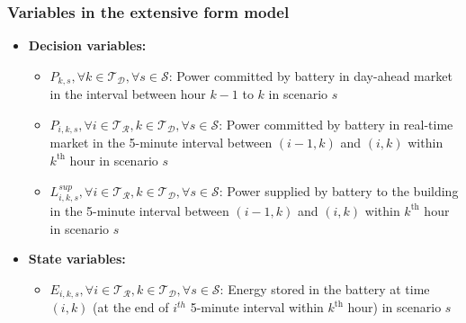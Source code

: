 \documentclass[11pt,twoside]{article}
\begin{document}
\subsubsection{Variables in the extensive form model}\label{subsubsec:var_ext}
\begin{itemize}
\item \textbf{Decision variables:}
\begin{itemize}
\item[\textbullet] $P_{k,s}, \forall k \in \mathcal{T_D}, \forall s \in \mathcal{S}$: Power committed by battery in day-ahead market in the interval between hour $k-1$ to $k$ in scenario $s$
\item[\textbullet] $P_{i,k,s}, \forall i \in \mathcal{T_R}, k \in \mathcal{T_D}, \forall s \in \mathcal{S}$: Power committed by battery in real-time market in the 5-minute interval between $(i-1,k)$ and $(i,k)$ within $k^\text{th}$ hour in scenario $s$
\item[\textbullet] $L^{sup}_{i,k,s}, \forall i \in \mathcal{T_R}, k \in \mathcal{T_D}, \forall s \in \mathcal{S}$: Power supplied by battery to the building in the 5-minute interval between $(i-1,k)$ and $(i,k)$ within $k^\text{th}$ hour in scenario $s$
\end{itemize}
\item \textbf{State variables:}
\begin{itemize}
\item[\textbullet] $E_{i,k,s}, \forall i \in \mathcal{T_R}, k \in \mathcal{T_D}, \forall s \in \mathcal{S}$: Energy stored in the battery at time $(i,k)$ (at the end of $i^{th}$ 5-minute interval within $k^\text{th}$ hour) in scenario $s$
\end{itemize}
\end{itemize}
\end{document}
